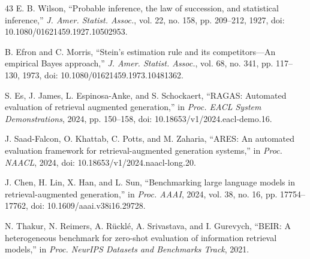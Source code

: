 \begin{thebibliography}{43}
 E. B. Wilson, ``Probable inference, the law of succession, and statistical inference,'' \emph{J. Amer. Statist. Assoc.}, vol. 22, no. 158, pp. 209--212, 1927, doi: 10.1080/01621459.1927.10502953.

 B. Efron and C. Morris, ``Stein's estimation rule and its competitors---An empirical Bayes approach,'' \emph{J. Amer. Statist. Assoc.}, vol. 68, no. 341, pp. 117--130, 1973, doi: 10.1080/01621459.1973.10481362.

 S. Es, J. James, L. Espinosa-Anke, and S. Schockaert, ``RAGAS: Automated evaluation of retrieval augmented generation,'' in \emph{Proc. EACL System Demonstrations}, 2024, pp. 150--158, doi: 10.18653/v1/2024.eacl-demo.16.

 J. Saad-Falcon, O. Khattab, C. Potts, and M. Zaharia, ``ARES: An automated evaluation framework for retrieval-augmented generation systems,'' in \emph{Proc. NAACL}, 2024, doi: 10.18653/v1/2024.naacl-long.20.

 J. Chen, H. Lin, X. Han, and L. Sun, ``Benchmarking large language models in retrieval-augmented generation,'' in \emph{Proc. AAAI}, 2024, vol. 38, no. 16, pp. 17754--17762, doi: 10.1609/aaai.v38i16.29728.

 N. Thakur, N. Reimers, A. R\"uckl\'e, A. Srivastava, and I. Gurevych, ``BEIR: A heterogeneous benchmark for zero-shot evaluation of information retrieval models,'' in \emph{Proc. NeurIPS Datasets and Benchmarks Track}, 2021.

\end{thebibliography}
